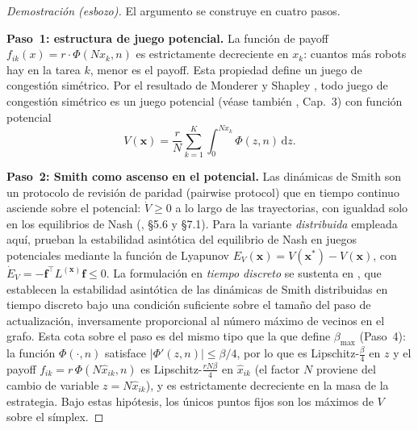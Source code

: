 \begin{proof}[Demostración (esbozo)]
El argumento se construye en cuatro pasos.

\textbf{Paso~1: estructura de juego potencial.}
La función de payoff $f_{ik}(x) = r \cdot \Phi(Nx_k, n)$ es estrictamente
decreciente en $x_k$: cuantos más robots hay en la tarea $k$, menor es el payoff.
Esta propiedad define un juego de congestión simétrico. Por el resultado de
Monderer y Shapley \citep{monderer1996potential}, todo juego de congestión
simétrico es un juego potencial (véase también \citealt{sandholm2010population},
Cap.~3) con función potencial
\[
  V(\mathbf{x}) = \frac{r}{N}\sum_{k=1}^K \int_0^{Nx_k} \Phi(z, n)\,\mathrm{d}z.
\]

\textbf{Paso~2: Smith como ascenso en el potencial.}
Las dinámicas de Smith son un protocolo de revisión de paridad (pairwise protocol)
que en tiempo continuo asciende sobre el potencial: $\dot{V} \geq 0$ a lo largo de
las trayectorias, con igualdad solo en los equilibrios de Nash
(\citealt{sandholm2010population}, \S5.6 y \S7.1). Para la variante \emph{distribuida}
empleada aquí, \citet{barreiro2017distributed} prueban la estabilidad
asintótica del equilibrio de Nash en juegos potenciales mediante la función de
Lyapunov $E_V(\mathbf{x}) = V(\mathbf{x}^*) - V(\mathbf{x})$, con
$\dot{E}_V = -\mathbf{f}^{\top} L^{(\mathbf{x})}\mathbf{f} \leq 0$. La formulación en
\emph{tiempo discreto} se sustenta en \citet{martinez2020formation,
martinezpiazuelo2022tcss}, que establecen la estabilidad asintótica de las dinámicas
de Smith distribuidas en tiempo discreto bajo una condición suficiente sobre el tamaño
del paso de actualización, inversamente proporcional al número máximo de vecinos en el
grafo.
Esta cota sobre el paso
es del mismo tipo que la que define $\beta_{\max}$ (Paso~4): la función $\Phi(\cdot,n)$
satisface $|\Phi'(z,n)| \leq \beta/4$, por lo que es Lipschitz-$\tfrac{\beta}{4}$ en
$z$ y el payoff $f_{ik} = r\,\Phi(N\hat{x}_{ik},n)$ es Lipschitz-$\tfrac{rN\beta}{4}$
en $\hat{x}_{ik}$ (el factor $N$ proviene del cambio de variable $z = N\hat{x}_{ik}$),
y es estrictamente decreciente en la masa de la estrategia. Bajo estas hipótesis,
los únicos puntos fijos son los máximos de $V$ sobre el símplex.


\end{proof}

